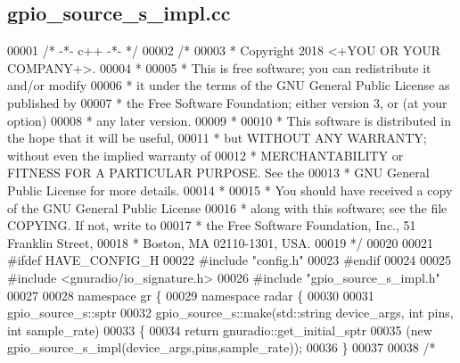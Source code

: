 \subsection{gpio\+\_\+source\+\_\+s\+\_\+impl.\+cc}
\label{gpio__source__s__impl_8cc_source}

\begin{DoxyCode}
00001 \textcolor{comment}{/* -*- c++ -*- */}
00002 \textcolor{comment}{/*}
00003 \textcolor{comment}{ * Copyright 2018 <+YOU OR YOUR COMPANY+>.}
00004 \textcolor{comment}{ *}
00005 \textcolor{comment}{ * This is free software; you can redistribute it and/or modify}
00006 \textcolor{comment}{ * it under the terms of the GNU General Public License as published by}
00007 \textcolor{comment}{ * the Free Software Foundation; either version 3, or (at your option)}
00008 \textcolor{comment}{ * any later version.}
00009 \textcolor{comment}{ *}
00010 \textcolor{comment}{ * This software is distributed in the hope that it will be useful,}
00011 \textcolor{comment}{ * but WITHOUT ANY WARRANTY; without even the implied warranty of}
00012 \textcolor{comment}{ * MERCHANTABILITY or FITNESS FOR A PARTICULAR PURPOSE.  See the}
00013 \textcolor{comment}{ * GNU General Public License for more details.}
00014 \textcolor{comment}{ *}
00015 \textcolor{comment}{ * You should have received a copy of the GNU General Public License}
00016 \textcolor{comment}{ * along with this software; see the file COPYING.  If not, write to}
00017 \textcolor{comment}{ * the Free Software Foundation, Inc., 51 Franklin Street,}
00018 \textcolor{comment}{ * Boston, MA 02110-1301, USA.}
00019 \textcolor{comment}{ */}
00020 
00021 \textcolor{preprocessor}{#ifdef HAVE\_CONFIG\_H}
00022 \textcolor{preprocessor}{#include "config.h"}
00023 \textcolor{preprocessor}{#endif}
00024 
00025 \textcolor{preprocessor}{#include <gnuradio/io\_signature.h>}
00026 \textcolor{preprocessor}{#include "gpio_source_s_impl.h"}
00027 
00028 \textcolor{keyword}{namespace }gr \{
00029   \textcolor{keyword}{namespace }radar \{
00030 
00031     gpio_source_s::sptr
00032     gpio_source_s::make(std::string device\_args, \textcolor{keywordtype}{int} pins, \textcolor{keywordtype}{int} sample\_rate)
00033     \{
00034       \textcolor{keywordflow}{return} gnuradio::get\_initial\_sptr
00035         (\textcolor{keyword}{new} gpio_source_s_impl(device\_args,pins,sample\_rate));
00036     \}
00037 
00038     \textcolor{comment}{/*}

\end{DoxyCode}
